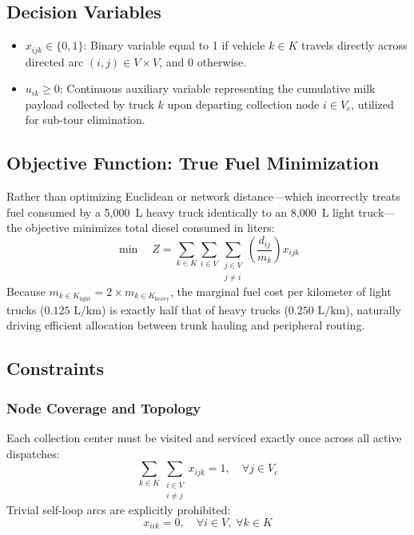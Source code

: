 \documentclass[11pt,a4paper]{article}
\begin{document}
\subsection{Decision Variables}
\begin{itemize}
    \item $x_{ijk} \in \{0, 1\}$: Binary variable equal to 1 if vehicle $k \in K$ travels directly across directed arc $(i, j) \in V \times V$, and 0 otherwise.
    \item $u_{ik} \ge 0$: Continuous auxiliary variable representing the cumulative milk payload collected by truck $k$ upon departing collection node $i \in V_c$, utilized for sub-tour elimination.
\end{itemize}

\subsection{Objective Function: True Fuel Minimization}
Rather than optimizing Euclidean or network distance---which incorrectly treats fuel consumed by a 5,000~L heavy truck identically to an 8,000~L light truck---the objective minimizes total diesel consumed in liters:
\begin{equation}
\min \quad Z = \sum_{k \in K} \sum_{i \in V} \sum_{\substack{j \in V \\ j \neq i}} \left( \frac{d_{ij}}{m_k} \right) x_{ijk}
\end{equation}
Because $m_{k \in K_{\text{light}}} = 2 \times m_{k \in K_{\text{heavy}}}$, the marginal fuel cost per kilometer of light trucks ($0.125\text{ L/km}$) is exactly half that of heavy trucks ($0.250\text{ L/km}$), naturally driving efficient allocation between trunk hauling and peripheral routing.

\subsection{Constraints}

\subsubsection{Node Coverage and Topology}
Each collection center must be visited and serviced exactly once across all active dispatches:
\begin{equation}
\sum_{k \in K} \sum_{\substack{i \in V \\ i \neq j}} x_{ijk} = 1, \quad \forall j \in V_c
\end{equation}
Trivial self-loop arcs are explicitly prohibited:
\begin{equation}
x_{iik} = 0, \quad \forall i \in V, \; \forall k \in K
\end{equation}
\end{document}
